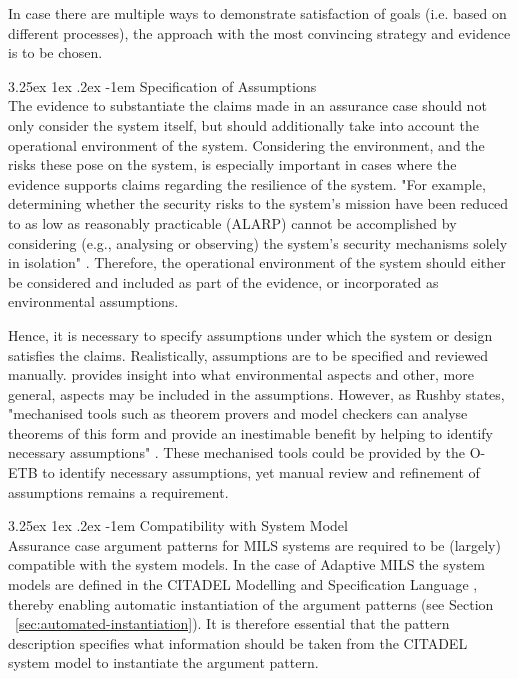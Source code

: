 \documentclass[12pt,twoside,a4paper]{article}
\makeatletter
\renewcommand\paragraph{\@startsection{paragraph}{5}{\z@}%
  {3.25ex \@plus1ex \@minus.2ex}%
  {-1em}%
  {\normalfont\normalsize\bfseries}}
\makeatother
\begin{document}
In case there are multiple ways to demonstrate satisfaction of goals (i.e. based on different processes), the approach with the most convincing strategy and evidence is to be chosen. 

\paragraph{Specification of Assumptions}
~\\
The evidence to substantiate the claims made in an assurance case should not only consider the system itself, but should additionally take into account the operational environment of the system. Considering the environment, and the risks these pose on the system, is especially important in cases where the evidence supports claims regarding the resilience of the system. "For example, determining whether the security risks to the system's mission have been reduced to as low as reasonably practicable (ALARP) cannot be accomplished by considering (e.g., analysing or observing) the system's security mechanisms solely in isolation" \cite{Lipson13evidence-of-assurance}. Therefore, the operational environment of the system should either be considered and included as part of the evidence, or incorporated as environmental assumptions. 

Hence, it is necessary to specify assumptions under which the system or design satisfies the claims. Realistically, assumptions are to be specified and reviewed manually. \cite{Lipson13evidence-of-assurance} provides insight into what environmental aspects and other, more general, aspects may be included in the assumptions. However, as Rushby states, "mechanised tools such as theorem provers and model checkers can analyse theorems of this form and provide an inestimable benefit by helping to identify necessary assumptions" \cite{Rushby09asafety-case}. These mechanised tools could be provided by the O-ETB to identify necessary assumptions, yet manual review and refinement of assumptions remains a requirement. 

\paragraph{Compatibility with System Model}\label{sec:languagemodelcompatibility}
~\\
Assurance case argument patterns for MILS systems are required to be (largely) compatible with the system models.
In the case of Adaptive MILS the system models are defined in the CITADEL Modelling and Specification Language  \cite{CITADEL-D3.1}, thereby enabling automatic instantiation of the argument patterns (see Section ~\ref{sec:automated-instantiation}). It is therefore essential that the pattern description specifies what information should be taken from the CITADEL system model to instantiate the argument pattern.  
\end{document}
